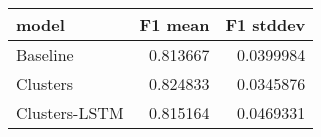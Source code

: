 \begin{tabular}{lrr}
\toprule
 model         &   F1 mean &   F1 stddev \\
\midrule
 Baseline      &  0.813667 &   0.0399984 \\
 Clusters      &  0.824833 &   0.0345876 \\
 Clusters-LSTM &  0.815164 &   0.0469331 \\
\bottomrule
\end{tabular}